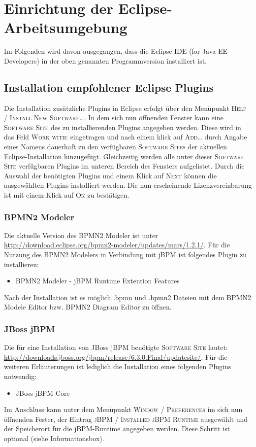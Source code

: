 \section{Einrichtung der Eclipse-Arbeitsumgebung}
Im Folgenden wird davon ausgegangen, dass die Eclipse IDE (for Java EE Developers) in der oben genannten Programmversion installiert ist.

\subsection{Installation empfohlener Eclipse Plugins}
Die Installation zusätzliche Plugins in Eclipse erfolgt über den Menüpunkt \textsc{Help / Install New Software\ldots}. In dem sich nun öffnenden Fenster kann eine \textsc{Software Site} des zu installierenden Plugins angegeben werden. Diese wird in das Feld \textsc{Work with:} eingetragen und nach einem klick auf \textsc{Add\ldots} durch Angabe eines Namens dauerhaft zu den verfügbaren \textsc{Software Sites} der aktuellen Eclipse-Installation hinzugefügt. Gleichzeitig werden alle unter dieser \textsc{Software Site} verfügbaren Plugins im unteren Bereich des Fensters aufgelistet. Durch die Auswahl der benötigten Plugins und einem Klick auf \textsc{Next} können die ausgewählten Plugins installiert werden. Die nun erscheinende Lizenzvereinbarung ist mit einem Klick auf \textsc{Ok} zu bestätigen.

\subsubsection{BPMN2 Modeler}
Die aktuelle Version des BPMN2 Modeler ist unter \url{http://download.eclipse.org/bpmn2-modeler/updates/mars/1.2.1/}. Für die Nutzung des BPMN2 Modelers in Verbindung mit jBPM ist folgendes Plugin zu installieren:
\begin{itemize}\renewcommand{\labelitemi}{\itemizecheck}
	\item BPMN2 Modeler - jBPM Runtime Extention Features
\end{itemize}
Nach der Installation ist es möglich {\ttfamily.bpmn} und {\ttfamily.bpmn2} Dateien mit dem BPMN2 Modele Editor bzw. BPMN2 Diagram Editor zu öffnen.

\subsubsection{JBoss jBPM}
Die für eine Installation von JBoss jBPM benötigte \textsc{Software Site} lautet: \url{http://downloads.jboss.org/jbpm/release/6.3.0.Final/updatesite/}. Für die weiteren Erläuterungen ist lediglich die Installation eines folgenden Plugins notwendig:
\begin{itemize}\renewcommand{\labelitemi}{\itemizecheck}
	\item JBoss jBPM Core
\end{itemize}
Im Anschluss kann unter dem Menüpunkt \textsc{Window / Preferences} im sich nun öffnenden Fester, der Eintrag \textsc{jBPM / Installed jBPM Runtime} ausgewählt und der Speicherort für die jBPM-Runtime angegeben werden. Diese Schritt ist optional (siehe Informationsbox).

